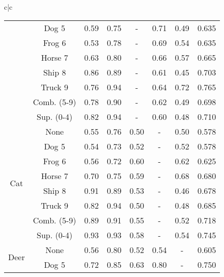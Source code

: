 \documentclass[acmtog, nonacm]{acmart}
\begin{document}
\begin{tabular}{c|c}
\begin{tabular}{@{}c|c|ccccc|c@{}}
                       & Dog    5                  & 0.59  & 0.75 & -    & 0.71 & 0.49 & 0.635                \\
                       & Frog   6                  & 0.53  & 0.78 & -    & 0.69 & 0.54 & 0.635                \\
                       & Horse 7                   & 0.63  & 0.80 & -    & 0.66 & 0.57 & 0.665                \\
                       & Ship   8                  & 0.86  & 0.89 & -    & 0.61 & 0.45 & 0.703                \\
                       & Truck 9                   & 0.76  & 0.94 & -    & 0.64 & 0.72 & 0.765                \\
                       & Comb. (5-9)               & 0.78  & 0.90 & -    & 0.62 & 0.49 & 0.698                \\
                       & Sup. (0-4)                & 0.82  & 0.94 & -    & 0.60 & 0.48 & 0.710                \\
                       \midrule
\multirow{8}{*}{Cat}   & None                      & 0.55  & 0.76 & 0.50 & -    & 0.50 & 0.578                \\
                       & Dog    5                  & 0.54  & 0.73 & 0.52 & -    & 0.52 & 0.578                \\
                       & Frog   6                  & 0.56  & 0.72 & 0.60 & -    & 0.62 & 0.625                \\
                       & Horse 7                   & 0.70  & 0.75 & 0.59 & -    & 0.68 & 0.680                \\
                       & Ship   8                  & 0.91  & 0.89 & 0.53 & -    & 0.46 & 0.678                \\
                       & Truck 9                   & 0.82  & 0.94 & 0.50 & -    & 0.48 & 0.685                \\
                       & Comb. (5-9)               & 0.89  & 0.91 & 0.55 & -    & 0.52 & 0.718                \\
                       & Sup. (0-4)                & 0.93  & 0.93 & 0.58 & -    & 0.54 & 0.745                \\
                       \midrule
\multirow{8}{*}{Deer}  & None                      & 0.56  & 0.80 & 0.52 & 0.54 & -    & 0.605                \\
                       & Dog    5                  & 0.72  & 0.85 & 0.63 & 0.80 & -    & 0.750                \\

\end{tabular}
\end{tabular}
\end{document}
